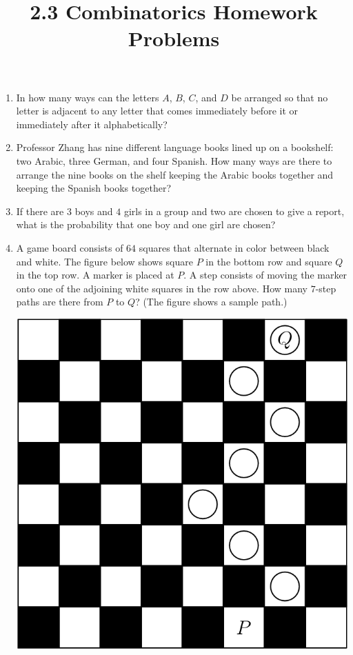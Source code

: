 \documentclass{article}
\title{2.3 Combinatorics Homework Problems}
\author{}
\date{}
\begin{document}
\maketitle

\begin{enumerate}
    \item In how many ways can the letters $A$, $B$, $C$, and $D$ be 
        arranged so that no letter is adjacent to any letter that comes 
        immediately before it or immediately after it alphabetically?
        \vspace{3cm}
    \item Professor Zhang has nine different language books lined up on a bookshelf: two Arabic, three German, and four Spanish.
        How many ways are there to arrange the nine books on the shelf keeping the Arabic books together and keeping the Spanish books together?
        \vspace{3cm}
    \item If there are $3$ boys and $4$ girls in a group and two are chosen 
        to give a report, what is the probability that one boy and one girl 
        are chosen?
        \vspace{3cm}
    \item A game board consists of $64$ squares that alternate in color between black and white.
        The figure below shows square $P$ in the bottom row and square $Q$ in the top row.
        A marker is placed at $P$.
        A step consists of moving the marker onto one of the adjoining white squares in the row above.
        How many $7$-step paths are there from $P$ to $Q$?
        (The figure shows a sample path.)
        \begin{center}
            \includegraphics[scale=0.25]{checker-board.png}
        \end{center}
        \vspace{3cm}
\end{enumerate}
\end{document}
